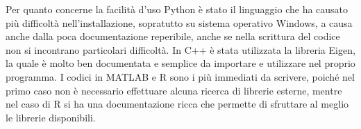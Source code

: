 \documentclass[a4paper,12pt]{article}
\begin{document}
\noindent Per quanto concerne la facilità d'uso Python è stato il linguaggio che ha causato più difficoltà nell'installazione, sopratutto su sistema operativo Windows, a causa anche dalla poca documentazione reperibile, anche se nella scrittura del codice non si incontrano particolari difficoltà. In C++ è stata utilizzata la libreria Eigen, la quale è molto ben documentata e semplice da importare e utilizzare nel proprio programma.
I codici in MATLAB e R sono i più immediati da scrivere, poiché nel primo caso non è necessario effettuare alcuna ricerca di librerie esterne, mentre nel caso di R si ha una documentazione ricca che permette di sfruttare al meglio le librerie disponibili.
\end{document}
